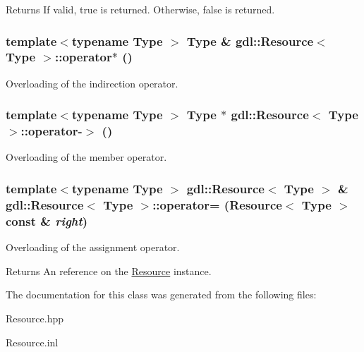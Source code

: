 \begin{DoxyReturn}{Returns}
If valid, true is returned. Otherwise, false is returned. 
\end{DoxyReturn}
\hypertarget{classgdl_1_1Resource_a750113d7aafe245fecb39089d15ebbe3}{
\subsubsection[{operator$\ast$}]{\setlength{\rightskip}{0pt plus 5cm}template$<$typename Type $>$ Type \& {\bf gdl::Resource}$<$ Type $>$::operator$\ast$ ()}}
\label{classgdl_1_1Resource_a750113d7aafe245fecb39089d15ebbe3}
Overloading of the indirection operator. \hypertarget{classgdl_1_1Resource_a0b869a1e27677c66bb78dec379e73658}{
\subsubsection[{operator-\/$>$}]{\setlength{\rightskip}{0pt plus 5cm}template$<$typename Type $>$ Type $\ast$ {\bf gdl::Resource}$<$ Type $>$::operator-\/$>$ ()}}
\label{classgdl_1_1Resource_a0b869a1e27677c66bb78dec379e73658}
Overloading of the member operator. \hypertarget{classgdl_1_1Resource_a8d4f9966f9a8047d0830fc0ce4c15d37}{
\subsubsection[{operator=}]{\setlength{\rightskip}{0pt plus 5cm}template$<$typename Type $>$ {\bf gdl::Resource}$<$ Type $>$ \& {\bf gdl::Resource}$<$ Type $>$::operator= ({\bf Resource}$<$ Type $>$ const \& {\em right})}}
\label{classgdl_1_1Resource_a8d4f9966f9a8047d0830fc0ce4c15d37}
Overloading of the assignment operator.

\begin{DoxyReturn}{Returns}
An reference on the \hyperlink{classgdl_1_1Resource}{Resource} instance. 
\end{DoxyReturn}


The documentation for this class was generated from the following files:\begin{DoxyCompactItemize}
\item 
Resource.hpp\item 
Resource.inl\end{DoxyCompactItemize}
